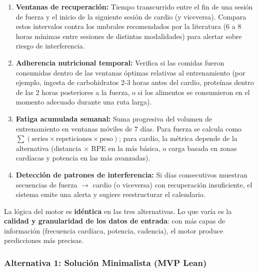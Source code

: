 \documentclass[12pt]{article}
\begin{document}
\begin{enumerate}
    \item \textbf{Ventanas de recuperación:} Tiempo transcurrido entre el fin de una sesión de fuerza y el inicio de la siguiente sesión de cardio (y viceversa). Compara estos intervalos contra los umbrales recomendados por la literatura (6 a 8 horas mínimas entre sesiones de distintas modalidades) para alertar sobre riesgo de interferencia.
    \item \textbf{Adherencia nutricional temporal:} Verifica si las comidas fueron consumidas dentro de las ventanas óptimas relativas al entrenamiento (por ejemplo, ingesta de carbohidratos 2-3 horas antes del cardio, proteínas dentro de las 2 horas posteriores a la fuerza, o si los alimentos se consumieron en el momento adecuado durante una ruta larga).
    \item \textbf{Fatiga acumulada semanal:} Suma progresiva del volumen de entrenamiento en ventanas móviles de 7 días. Para fuerza se calcula como $\sum(\text{series} \times \text{repeticiones} \times \text{peso})$; para cardio, la métrica depende de la alternativa (distancia $\times$ RPE en la más básica, o carga basada en zonas cardíacas y potencia en las más avanzadas).
    \item \textbf{Detección de patrones de interferencia:} Si días consecutivos muestran secuencias de fuerza $\rightarrow$ cardio (o viceversa) con recuperación insuficiente, el sistema emite una alerta y sugiere reestructurar el calendario.
\end{enumerate}

La lógica del motor es \textbf{idéntica} en las tres alternativas. Lo que varía es la \textbf{calidad y granularidad de los datos de entrada}: con más capas de información (frecuencia cardíaca, potencia, cadencia), el motor produce predicciones más precisas.

\subsubsection{Alternativa 1: Solución Minimalista (MVP Lean)}
\end{document}
